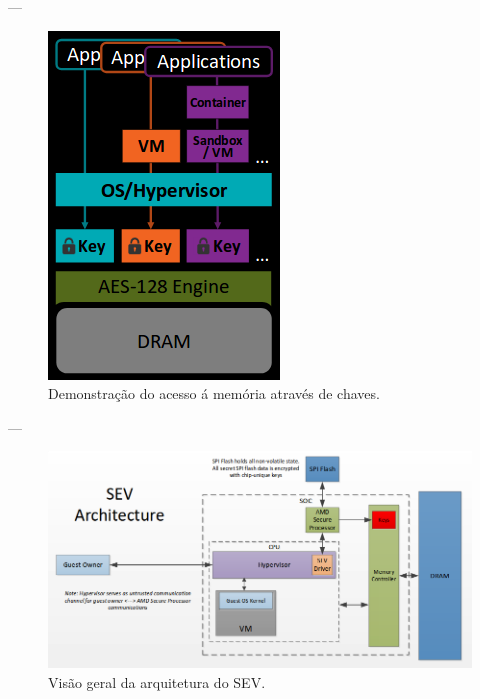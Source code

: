 \documentclass{beamer}
\newcommand{\autotitle}[1]{\secname{} --- \subsecname}
\begin{document}
\begin{frame}{\autotitle{}}
    \begin{figure}
        \centering
        \includegraphics[keepaspectratio,height=.8\textheight]{img/sev}
        \caption{Demonstração do acesso á memória através de chaves.}
    \end{figure}
\end{frame}

\begin{frame}{\autotitle{}}
    \begin{figure}
        \centering
        \includegraphics[keepaspectratio,width=1\textwidth]{img/sev-architecture}
        \caption{Visão geral da arquitetura do SEV.}
    \end{figure}
\end{frame}
\end{document}
